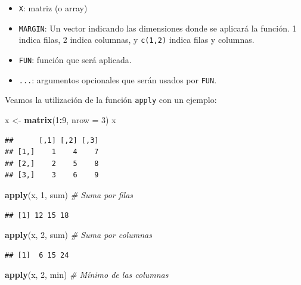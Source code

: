 \documentclass[
]{book}
\newenvironment{Shaded}{\begin{snugshade}}{\end{snugshade}}
\newcommand{\CommentTok}[1]{\textcolor[rgb]{0.56,0.35,0.01}{\textit{#1}}}
\newcommand{\DataTypeTok}[1]{\textcolor[rgb]{0.13,0.29,0.53}{#1}}
\newcommand{\DecValTok}[1]{\textcolor[rgb]{0.00,0.00,0.81}{#1}}
\newcommand{\KeywordTok}[1]{\textcolor[rgb]{0.13,0.29,0.53}{\textbf{#1}}}
\newcommand{\NormalTok}[1]{#1}
\newcommand{\OperatorTok}[1]{\textcolor[rgb]{0.81,0.36,0.00}{\textbf{#1}}}
\newcommand{\StringTok}[1]{\textcolor[rgb]{0.31,0.60,0.02}{#1}}
\providecommand{\tightlist}{%
  \setlength{\itemsep}{0pt}\setlength{\parskip}{0pt}}
\begin{document}
\begin{itemize}
\tightlist
\item
  \texttt{X}: matriz (o array)
\item
  \texttt{MARGIN}: Un vector indicando las dimensiones donde se aplicará
  la función. 1 indica filas, 2 indica columnas, y \texttt{c(1,2)} indica
  filas y columnas.
\item
  \texttt{FUN}: función que será aplicada.
\item
  \texttt{...}: argumentos opcionales que serán usados por \texttt{FUN}.
\end{itemize}

Veamos la utilización de la función \texttt{apply} con un ejemplo:

\begin{Shaded}
\begin{Highlighting}[]
\NormalTok{x <-}\StringTok{ }\KeywordTok{matrix}\NormalTok{(}\DecValTok{1}\OperatorTok{:}\DecValTok{9}\NormalTok{, }\DataTypeTok{nrow =} \DecValTok{3}\NormalTok{)}
\NormalTok{x}
\end{Highlighting}
\end{Shaded}

\begin{verbatim}
##      [,1] [,2] [,3]
## [1,]    1    4    7
## [2,]    2    5    8
## [3,]    3    6    9
\end{verbatim}

\begin{Shaded}
\begin{Highlighting}[]
\KeywordTok{apply}\NormalTok{(x, }\DecValTok{1}\NormalTok{, sum)    }\CommentTok{# Suma por filas}
\end{Highlighting}
\end{Shaded}

\begin{verbatim}
## [1] 12 15 18
\end{verbatim}

\begin{Shaded}
\begin{Highlighting}[]
\KeywordTok{apply}\NormalTok{(x, }\DecValTok{2}\NormalTok{, sum)    }\CommentTok{# Suma por columnas}
\end{Highlighting}
\end{Shaded}

\begin{verbatim}
## [1]  6 15 24
\end{verbatim}

\begin{Shaded}
\begin{Highlighting}[]
\KeywordTok{apply}\NormalTok{(x, }\DecValTok{2}\NormalTok{, min)    }\CommentTok{# Mínimo de las columnas}
\end{Highlighting}
\end{Shaded}
\end{document}
